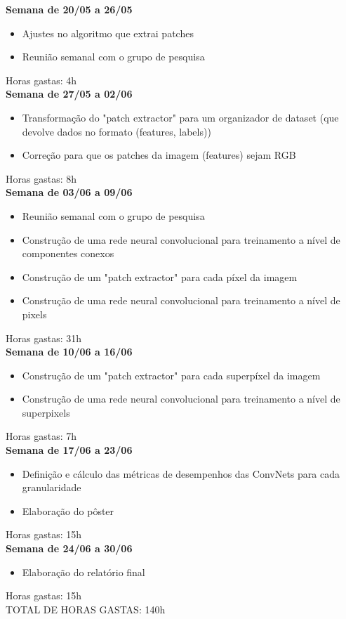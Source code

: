 \documentclass{article}
\begin{document}
\begin{appendices}
{			\textbf{Semana de 20/05 a 26/05}
			\begin{itemize}
				\item Ajustes no algoritmo que extrai patches 
				\item Reunião semanal com o grupo de pesquisa				
			\end{itemize}
			Horas gastas: 4h \\
			
			\textbf{Semana de 27/05 a 02/06}
			\begin{itemize}
				\item Transformação do "patch extractor" para um organizador de dataset (que devolve dados no formato (features, labels)) 
				\item Correção para que os patches da imagem (features) sejam RGB 	
			\end{itemize}
			Horas gastas: 8h \\
			
			\textbf{Semana de 03/06 a 09/06}
			\begin{itemize}
				\item Reunião semanal com o grupo de pesquisa 
				\item Construção de uma rede neural convolucional para treinamento a nível de componentes conexos 
				\item Construção de um "patch extractor" para cada píxel da imagem
				\item Construção de uma rede neural convolucional para treinamento a nível de pixels 			
			\end{itemize}
			Horas gastas: 31h \\
			
			\textbf{Semana de 10/06 a 16/06}
			\begin{itemize}
				\item Construção de um "patch extractor" para cada superpíxel da imagem
				\item Construção de uma rede neural convolucional para treinamento a nível de superpixels 			
			\end{itemize}
			Horas gastas: 7h \\
			
			\textbf{Semana de 17/06 a 23/06}
			\begin{itemize}
				\item Definição e cálculo das métricas de desempenhos das ConvNets para cada granularidade 
				\item Elaboração do pôster 			
			\end{itemize}
			Horas gastas: 15h \\
			
			\textbf{Semana de 24/06 a 30/06}
			\begin{itemize}
				\item Elaboração do relatório final			
			\end{itemize}
			Horas gastas: 15h \\ 
			
			TOTAL DE HORAS GASTAS: 140h
		}
	\end{appendices}
	
\end{document}
